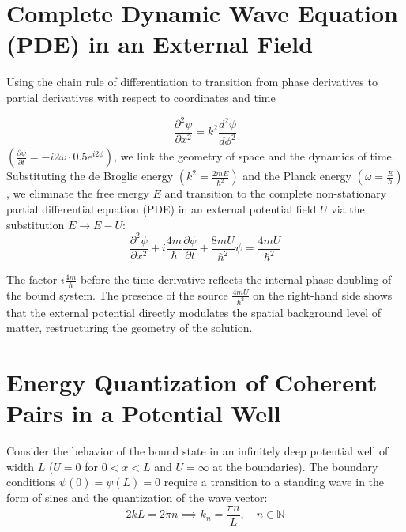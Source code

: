 \documentclass{article}
\begin{document}
\section{Complete Dynamic Wave Equation (PDE) in an External Field}
Using the chain rule of differentiation to transition from phase derivatives to partial derivatives with respect to coordinates and time 

\vspace{0.5cm}

\begin{equation}
\frac{\partial^2\psi}{\partial x^2} = k^2 \frac{d^2\psi}{d\phi^2}
\end{equation} 
\vspace{0.5cm}
$\left(\frac{\partial \psi}{\partial t} = -i2\omega \cdot 0.5e^{i2\phi}\right)$, we link the geometry of space and the dynamics of time. Substituting the de Broglie energy $\left(k^2 = \frac{2mE}{\hbar^2}\right)$ and the Planck energy $\left(\omega = \frac{E}{\hbar}\right)$, we eliminate the free energy $E$ and transition to the complete non-stationary partial differential equation (PDE) in an external potential field $U$ via the substitution $E \to E - U$:
\begin{equation}
\frac{\partial^2\psi}{\partial x^2} + i\frac{4m}{\hbar}\frac{\partial\psi}{\partial t} + \frac{8mU}{\hbar^2}\psi = \frac{4mU}{\hbar^2}
\end{equation}

The factor $i\frac{4m}{\hbar}$ before the time derivative reflects the internal phase doubling of the bound system. The presence of the source $\frac{4mU}{\hbar^2}$ on the right-hand side shows that the external potential directly modulates the spatial background level of matter, restructuring the geometry of the solution.

\section{Energy Quantization of Coherent Pairs in a Potential Well}
Consider the behavior of the bound state in an infinitely deep potential well of width $L$ ($U = 0$ for $0 < x < L$ and $U = \infty$ at the boundaries). The boundary conditions $\psi(0) = \psi(L) = 0$ require a transition to a standing wave in the form of sines and the quantization of the wave vector:
\begin{equation}
2kL = 2\pi n \implies k_n = \frac{\pi n}{L}, \quad n \in \mathbb{N}
\end{equation}
\end{document}
